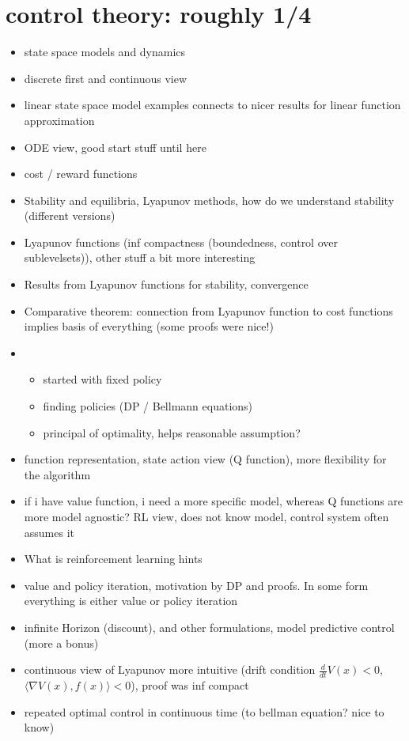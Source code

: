\section{control theory: roughly 1/4}
\begin{itemize}
    \item state space models and dynamics 
    \item discrete first and continuous view
    \item linear state space model examples connects to nicer results for linear function approximation
    \item ODE view,  good start stuff until here 
    \item cost / reward functions  
    \item Stability and equilibria, Lyapunov methods, how do we understand stability (different versions) 
    \item Lyapunov functions (inf compactness (boundedness, control over sublevelsets)), other stuff a bit more interesting
    \item Results from Lyapunov functions for stability, convergence 
    \item Comparative theorem: connection from Lyapunov function to cost functions implies basis of everything (some proofs were nice!)
    \item \begin{itemize}
        \item started with fixed policy 
        \item finding policies (DP / Bellmann equations)
        \item principal of optimality, helps reasonable assumption?  
    \end{itemize}
    \item function representation, state action view (Q function), more flexibility for the algorithm
    \item if i have value function, i need a more specific model, whereas Q functions are more model agnostic? RL view, does not know model, control system often assumes it
    \item What is reinforcement learning hints 
    \item value and policy iteration, motivation by DP and proofs. In some form everything is either value or policy iteration 
    \item infinite Horizon (discount), and other formulations, model predictive control (more a bonus)
    \item continuous view of Lyapunov more intuitive (drift condition \(\frac{d}{dt} V(x)<0\), \(\langle \nabla V(x),f(x)\rangle<0\)), proof was inf compact 
    \item repeated optimal control in continuous time (to bellman equation? nice to know) 
\end{itemize}


